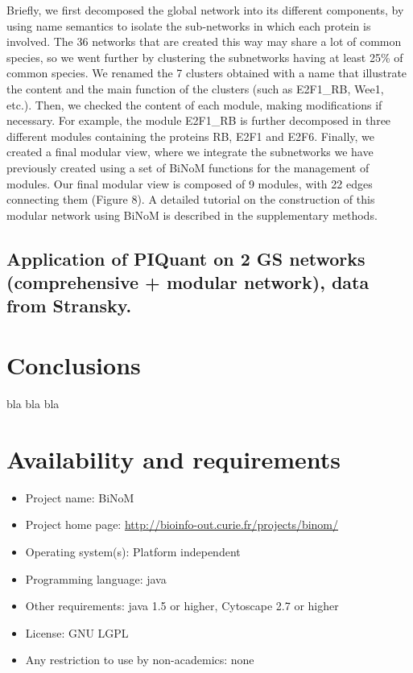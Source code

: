 \documentclass[10pt]{bmc_article}
\newenvironment{bmcformat}{\baselineskip20pt\sloppy\setboolean{publ}{false}}{\baselineskip20pt\sloppy}
\begin{document}
\begin{bmcformat}
Briefly, we first decomposed the global network into its different components,
by using name semantics to isolate the sub-networks in which
each protein is involved. The 36 networks that are created this way may share a
lot of common species, so we went further
by clustering the subnetworks having at least 25\% of common species. We renamed
the 7 clusters obtained with a name that illustrate the content and the main
function of the clusters (such as E2F1\_RB, Wee1, etc.). Then, we checked the
content of each module, making modifications if necessary. For example, the
module E2F1\_RB is
further decomposed in three different modules containing the proteins RB, E2F1
and E2F6. Finally, we created a final modular view, where we integrate the
subnetworks we have previously created using a set of BiNoM functions for the
management of modules. Our final modular view is composed of 9 modules, with 22
edges connecting them (Figure 8). A detailed tutorial on the construction of
this modular network using BiNoM is described in the supplementary methods.


\subsection*{Application of PIQuant on 2 GS networks (comprehensive + modular
network), data from Stransky.}

\section*{Conclusions}

bla bla bla

\section*{Availability and requirements}

\begin{itemize}
\item Project name: BiNoM
\item Project home page: \url{http://bioinfo-out.curie.fr/projects/binom/}
\item Operating system(s): Platform independent
\item Programming language: java
\item Other requirements: java 1.5 or higher, Cytoscape 2.7 or higher
\item License: GNU LGPL
\item Any restriction to use by non-academics: none
\end{itemize}





\end{bmcformat}
\end{document}
